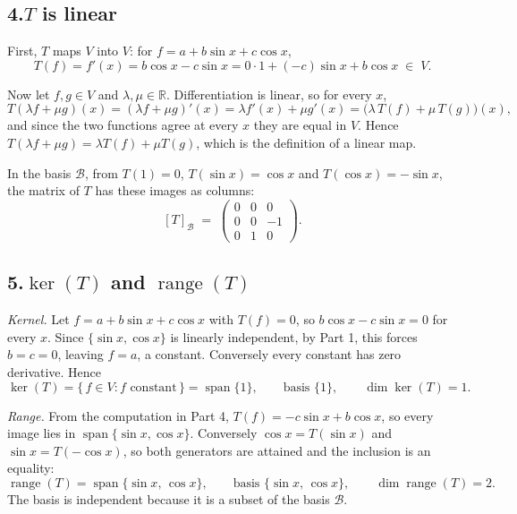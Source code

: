 \documentclass[11pt]{article}
\DeclareMathOperator{\spn}{span}
\theoremstyle{definition}\newtheorem*{definition}{Definition}
\theoremstyle{definition}
\begin{document}
\subsection*{4.\quad $T$ is linear}

First, $T$ maps $V$ into $V$: for
$f = a + b\sin x + c\cos x$,
\[
  T(f) = f'(x) = b\cos x - c\sin x
  = 0 \cdot 1 + (-c)\sin x + b \cos x \;\in\; V .
\]

Now let $f, g \in V$ and $\lambda, \mu \in \mathbb{R}$. Differentiation
is linear, so for every $x$,
\[
  T(\lambda f + \mu g)(x)
  = (\lambda f + \mu g)'(x)
  = \lambda f'(x) + \mu g'(x)
  = \big(\lambda\, T(f) + \mu\, T(g)\big)(x),
\]
and since the two functions agree at every $x$ they are equal in $V$.
Hence $T(\lambda f + \mu g) = \lambda T(f) + \mu T(g)$, which is the
definition of a linear map.

In the basis $\mathcal{B}$, from $T(1) = 0$, $T(\sin x) = \cos x$ and
$T(\cos x) = -\sin x$, the matrix of $T$ has these images as columns:
\[
  [T]_{\mathcal{B}} \;=\;
  \begin{pmatrix}
    0 & 0 & 0 \\
    0 & 0 & -1 \\
    0 & 1 & 0
  \end{pmatrix}.
\]

\subsection*{5.\quad $\ker(T)$ and $\operatorname{range}(T)$}

\emph{Kernel.} Let $f = a + b\sin x + c\cos x$ with $T(f) = 0$, so
$b\cos x - c\sin x = 0$ for every $x$. Since $\{\sin x, \cos x\}$ is
linearly independent, by Part 1, this forces $b = c = 0$, leaving
$f = a$, a constant. Conversely every constant has zero derivative.
Hence
\[
  \ker(T) = \{\, f \in V : f \text{ constant} \,\} = \spn\{1\},
  \qquad \text{basis } \{1\},
  \qquad \dim \ker(T) = 1 .
\]

\emph{Range.} From the computation in Part 4,
$T(f) = -c \sin x + b \cos x$, so every image lies in
$\spn\{\sin x, \cos x\}$. Conversely $\cos x = T(\sin x)$ and
$\sin x = T(-\cos x)$, so both generators are attained and the inclusion
is an equality:
\[
  \operatorname{range}(T) = \spn\{\sin x,\, \cos x\},
  \qquad \text{basis } \{\sin x,\, \cos x\},
  \qquad \dim \operatorname{range}(T) = 2 .
\]
The basis is independent because it is a subset of the basis
$\mathcal{B}$.
\end{document}
